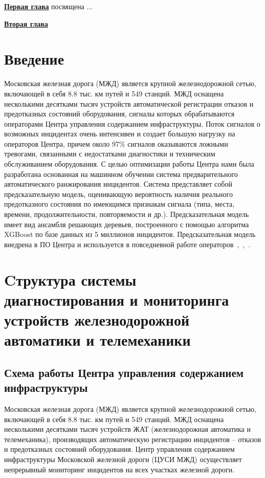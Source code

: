 \underline{\textbf{Первая глава}} посвящена ...



\underline{\textbf{Вторая глава}} \section{Введение}
Московская железная дорога (МЖД) является крупной железнодорожной сетью, включающей в себя 8.8 тыс. км путей и 549 станций. МЖД оснащена несколькими десятками тысяч устройств автоматической регистрации отказов и предотказных состояний оборудования, сигналы которых обрабатываются операторами Центра управления содержанием инфраструктуры. Поток сигналов о возможных инцидентах очень интенсивен и создает большую нагрузку на операторов Центра, причем около 97\% сигналов оказываются ложными тревогами, связанными с недостатками диагностики и техническим обслуживанием оборудования. С целью оптимизации работы Центра нами была разработана основанная на машинном обучении система предварительного автоматического ранжирования инцидентов. Система представляет собой предсказательную модель, оценивающую вероятность наличия реального предотказного состояния по имеющимся признакам сигнала (типа, места, времени,  продолжительности, повторяемости и др.). Предсказательная модель имеет вид ансамбля решающих деревьев, построенного с помощью алгоритма XGBoost по базе данных из 5 миллионов инцидентов. Предсказательная модель внедрена в ПО Центра и используется в повседневной работе операторов~\cite{bulletin-rzd},~\cite{itivs-2017},~\cite{icmla-2017}.

\section{Cтруктура системы диагностирования и мониторинга устройств железнодорожной автоматики и телемеханики}
\subsection{Схема работы Центра управления содержанием инфраструктуры}
Московская железная дорога (МЖД) является крупной железнодорожной сетью, включающей в себя 8.8 тыс. км путей и 549 станций. МЖД оснащена несколькими десятками тысяч устройств ЖАТ (железнодорожная автоматика и телемеханика), производящих автоматическую регистрацию инцидентов -- отказов и предотказных состояний оборудования. Центр управления содержанием инфраструктуры Московской железной дороги (ЦУСИ МЖД) осуществляет непрерывный мониторинг инцидентов на всех участках железной дороги.

